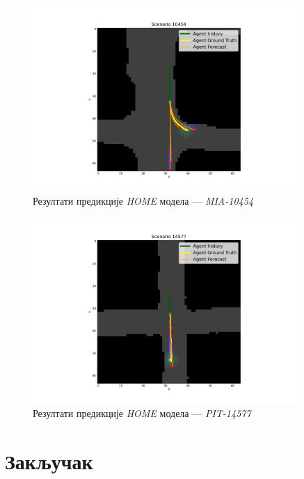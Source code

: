 \documentclass[11pt,oneside]{memoir}
\begin{document}
\begin{figure}[H]
  \centering
  \includegraphics[width=0.9\textwidth]{images/home_MIA_10454.png}
  \caption{Резултати предикције \textit{HOME} модела --- \textit{MIA-10454} \label{home-MIA-10454}}
\end{figure}

\begin{figure}[H]
  \centering
  \includegraphics[width=0.9\textwidth]{images/home_PIT_14577.png}
  \caption{Резултати предикције \textit{HOME} модела --- \textit{PIT-14577} \label{home-PIT-14577}}
\end{figure}

\chapter{Закључак}
\end{document}

